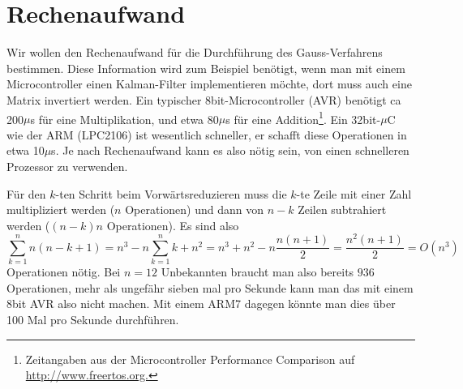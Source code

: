 %
%
%
\section{Rechenaufwand}
Wir wollen den Rechenaufwand für die Durchführung des Gauss-Verfahrens
bestimmen.
Diese Information wird zum Beispiel benötigt, wenn man mit
einem Microcontroller einen Kalman-Filter implementieren möchte, dort
muss auch eine Matrix invertiert werden.
Ein typischer 8bit-Microcontroller (AVR)
benötigt ca 200$\mu$s für eine Multiplikation, und etwa 80$\mu$s für
eine Addition\footnote{Zeitangaben aus der Microcontroller Performance
Comparison auf \url {http://www.freertos.org.}}.
Ein 32bit-$\mu$C wie der ARM (LPC2106) ist wesentlich schneller,
er schafft diese Operationen in etwa 10$\mu$s.
Je nach Rechenaufwand kann
es also nötig sein, von einen schnelleren Prozessor zu verwenden.

Für den $k$-ten Schritt beim Vorwärtsreduzieren muss die $k$-te
Zeile mit einer Zahl multipliziert werden ($n$ Operationen) und dann
von $n-k$ Zeilen subtrahiert werden ($(n-k)n$ Operationen).
Es sind also
\[
\sum_{k=1}^n n(n-k+1) = n^3 - n \sum_{k=1}^n k + n^2
=n^3+n^2-n\frac{n(n+1)}2=\frac{n^2(n+1)}2 =O(n^3)
\]
Operationen nötig.
Bei $n=12$ Unbekannten braucht man also bereits
$936$ Operationen, mehr als ungefähr sieben mal pro Sekunde kann man das mit
einem 8bit AVR also nicht machen.
Mit einem ARM7 dagegen könnte
man dies über 100 Mal pro Sekunde durchführen.

